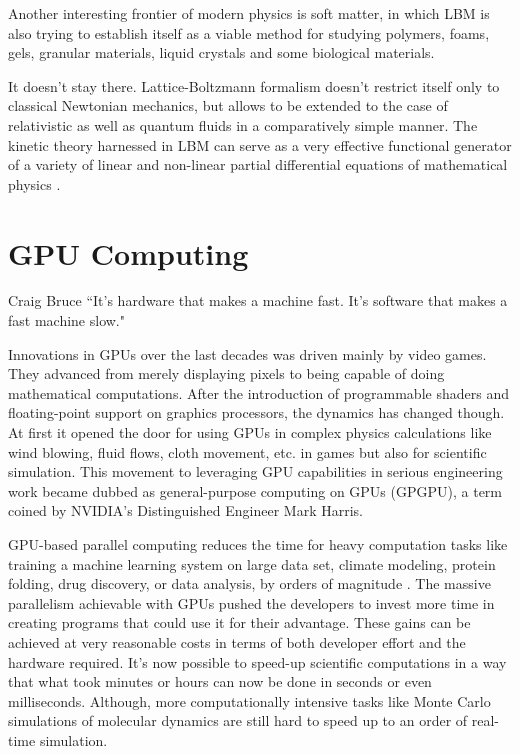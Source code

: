 Another interesting frontier of modern physics is soft matter, in which LBM is also trying to establish itself as a viable method for studying polymers, foams, gels, granular materials, liquid crystals and some biological materials.

It doesn't stay there. Lattice-Boltzmann formalism doesn't restrict itself only to classical Newtonian mechanics, but allows to be extended to the case of relativistic as well as quantum fluids in a comparatively simple manner. The kinetic theory harnessed in LBM can serve as a very effective functional generator of a variety of linear and non-linear partial differential equations of mathematical physics \citep{succi2018}.


\section{GPU Computing}\label{gpu-computing}
\begin{chapquote}{Craig Bruce}
	``It’s hardware that makes a machine fast.  It’s software that makes a fast machine slow."
\end{chapquote}

Innovations in GPUs over the last decades was driven mainly by video games. They advanced from merely displaying pixels to being capable of doing mathematical computations. After the introduction of programmable shaders and floating-point support on graphics processors, the dynamics has changed though. At first it opened the door for using GPUs in complex physics calculations like wind blowing, fluid flows, cloth movement, etc. in games but also for scientific simulation. This movement to leveraging GPU capabilities in serious engineering work became dubbed as general-purpose computing on GPUs (GPGPU), a term coined by NVIDIA's Distinguished Engineer Mark Harris.

GPU-based parallel computing reduces the time for heavy computation tasks like training a machine learning system on large data set, climate modeling, protein folding, drug discovery, or data analysis, by orders of magnitude \citep{stortiCUDAEngineersIntroduction2016, PACHECO20111}. The massive parallelism achievable with GPUs pushed the developers to invest more time in creating programs that could use it for their advantage. These gains can be achieved at very reasonable costs in terms of both developer effort and the hardware required. It's now possible to speed-up scientific computations in a way that what took minutes or hours can now be done in seconds or even milliseconds. Although, more computationally intensive tasks like Monte Carlo simulations of molecular dynamics are still hard to speed up to an order of real-time simulation.

